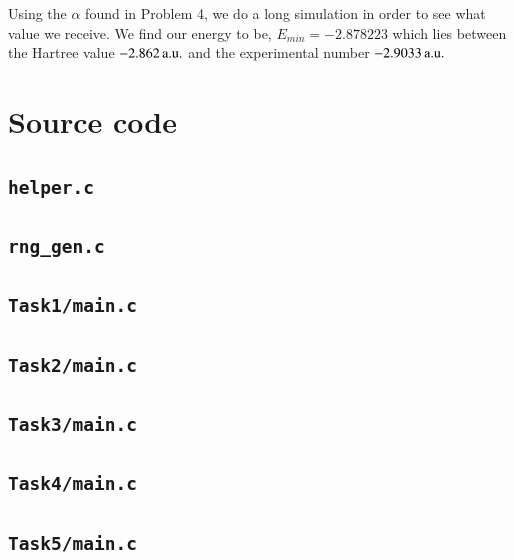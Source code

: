 Using the $\alpha$ found in Problem 4, we do a long simulation in order to see what value we receive. We find our energy to be, $E_{min}=-2.878223$ which lies between the Hartree value $\unit[-2.862]{a.u.}$ and the experimental number $\unit[-2.9033]{a.u.}$






\appendix
\section{Source code}
\subsection{\texttt{helper.c}}


\subsection{\texttt{rng\_gen.c}}


\subsection{\texttt{Task1/main.c}}


\subsection{\texttt{Task2/main.c}}


\subsection{\texttt{Task3/main.c}}


\subsection{\texttt{Task4/main.c}}


\subsection{\texttt{Task5/main.c}}




